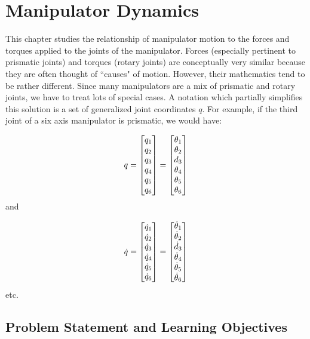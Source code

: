 %

\chapter{Manipulator Dynamics}


This chapter studies the relationship of manipulator motion to the forces and torques applied to the joints of the manipulator.   Forces (especially pertinent to prismatic joints) and torques (rotary joints) are conceptually very similar because they are often thought of  ``causes" of motion.   However, their mathematics tend to be rather different.  Since many manipulators are a mix of prismatic and rotary joints, we have to treat lots of special cases.   A notation which partially simplifies this solution is a set of generalized joint coordinates $q$.  For example, if the third joint of a six axis manipulator is prismatic, we would have:

\[
q =
\begin{bmatrix} q_1\\q_2\\q_3\\q_4\\q_5\\q_6\end{bmatrix} =
\begin{bmatrix} \theta_1\\ \theta_2 \\ d_3 \\ \theta_4 \\ \theta_5 \\ \theta_6 \end{bmatrix}
\]
and

\[
\dot q =
\begin{bmatrix} \dot q_1\\ \dot q_2\\ \dot q_3\\ \dot q_4\\ \dot q_5\\\dot q_6\end{bmatrix} =
\begin{bmatrix} \dot\theta_1\\ \dot\theta_2 \\ \dot d_3 \\ \dot\theta_4 \\ \dot\theta_5 \\ \dot\theta_6 \end{bmatrix}
\]
etc.


\section{Problem Statement and Learning Objectives}





